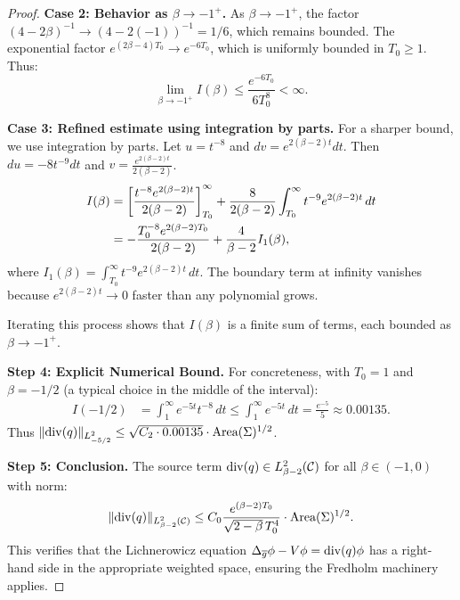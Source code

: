 \begin{proof}
\textbf{Case 2: Behavior as $\beta \to -1^+$.}
As $\beta \to -1^+$, the factor $(4 - 2\beta)^{-1} \to (4 - 2(-1))^{-1} = 1/6$, which remains bounded. The exponential factor $e^{(2\beta-4)T_0} \to e^{-6T_0}$, which is uniformly bounded in $T_0 \ge 1$. Thus:
\begin{equation}
    \lim_{\beta \to -1^+} I(\beta) \le \frac{e^{-6T_0}}{6 T_0^8} < \infty.
\end{equation}

\textbf{Case 3: Refined estimate using integration by parts.}
For a sharper bound, we use integration by parts. Let $u = t^{-8}$ and $dv = e^{2(\beta-2)t} dt$. Then $du = -8t^{-9} dt$ and $v = \frac{e^{2(\beta-2)t}}{2(\beta-2)}$.
\begin{align}
    I(\beta) &= \left[ \frac{t^{-8} e^{2(\beta-2)t}}{2(\beta-2)} \right]_{T_0}^\infty + \frac{8}{2(\beta-2)} \int_{T_0}^\infty t^{-9} e^{2(\beta-2)t} \, dt \notag \\
    &= -\frac{T_0^{-8} e^{2(\beta-2)T_0}}{2(\beta-2)} + \frac{4}{\beta-2} I_1(\beta), \label{eq:IBP}
\end{align}
where $I_1(\beta) = \int_{T_0}^\infty t^{-9} e^{2(\beta-2)t} \, dt$. The boundary term at infinity vanishes because $e^{2(\beta-2)t} \to 0$ faster than any polynomial grows.

Iterating this process shows that $I(\beta)$ is a finite sum of terms, each bounded as $\beta \to -1^+$.

\textbf{Step 4: Explicit Numerical Bound.}
For concreteness, with $T_0 = 1$ and $\beta = -1/2$ (a typical choice in the middle of the interval):
\begin{align}
    I(-1/2) &= \int_1^\infty e^{-5t} t^{-8} \, dt \le \int_1^\infty e^{-5t} \, dt = \frac{e^{-5}}{5} \approx 0.00135.
\end{align}
Thus $\|\mathrm{div}(q)\|_{L^2_{-5/2}} \le \sqrt{C_2 \cdot 0.00135} \cdot \text{Area}(\Sigma)^{1/2}$.

\textbf{Step 5: Conclusion.}
The source term $\mathrm{div}(q) \in L^2_{\beta-2}(\mathcal{C})$ for all $\beta \in (-1, 0)$ with norm:
\begin{equation}
    \|\mathrm{div}(q)\|_{L^2_{\beta-2}(\mathcal{C})} \le C_0 \frac{e^{(\beta-2)T_0}}{\sqrt{2-\beta} \, T_0^4} \cdot \text{Area}(\Sigma)^{1/2}.
\end{equation}
This verifies that the Lichnerowicz equation $\Delta_{\overline{g}} \phi - V \phi = \mathrm{div}(q) \phi$ has a right-hand side in the appropriate weighted space, ensuring the Fredholm machinery applies.
\end{proof}

